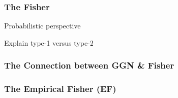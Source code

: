 \subsubsection{The Fisher}
Probabilistic perspective

Explain type-1 versus type-2
\subsubsection{The Connection between GGN \& Fisher}
\subsubsection{The Empirical Fisher (EF)}

